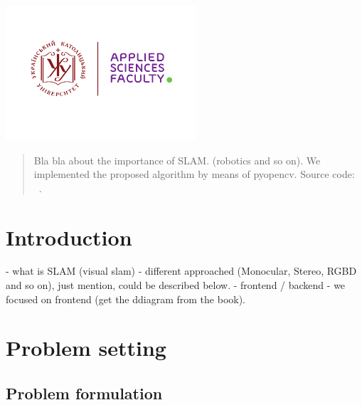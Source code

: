 \begin{titlepage}

\includegraphics[height=5cm]{UCU-Apps.png}\\[1cm] %
 

\vfill %

\end{titlepage}



\begin{abstract}
Bla bla about the importance of SLAM. (robotics and so on). We implemented the proposed algorithm by means of pyopencv. Source code: ~\cite{GitHub}.
\end{abstract}

\section{Introduction}

 - what is SLAM (visual slam)
 - different approached (Monocular, Stereo, RGBD and so on), just mention, could be described below. 
 - frontend / backend - we focused on frontend (get the ddiagram from the book).
 

\section{Problem setting}
\label{sec:examples}

\subsection{Problem formulation}

